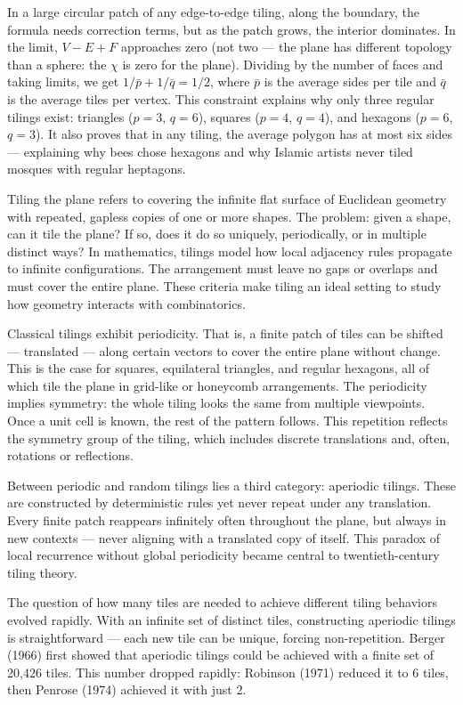 In a large circular patch of any edge-to-edge tiling, along the boundary, the formula needs correction terms, but as the patch grows, the interior dominates. In the limit, $V - E + F$ approaches zero (not two — the plane has different topology than a sphere: the $\chi$ is zero for the plane). Dividing by the number of faces and taking limits, we get $1/\bar{p} + 1/\bar{q} = 1/2$, where $\bar{p}$ is the average sides per tile and $\bar{q}$ is the average tiles per vertex. This constraint explains why only three regular tilings exist: triangles ($p=3$, $q=6$), squares ($p=4$, $q=4$), and hexagons ($p=6$, $q=3$). It also proves that in any tiling, the average polygon has at most six sides — explaining why bees chose hexagons and why Islamic artists never tiled mosques with regular heptagons.

Tiling the plane refers to covering the infinite flat surface of Euclidean geometry with repeated, gapless copies of one or more shapes. The problem: given a shape, can it tile the plane? If so, does it do so uniquely, periodically, or in multiple distinct ways? In mathematics, tilings model how local adjacency rules propagate to infinite configurations. The arrangement must leave no gaps or overlaps and must cover the entire plane. These criteria make tiling an ideal setting to study how geometry interacts with combinatorics.

Classical tilings exhibit periodicity. That is, a finite patch of tiles can be shifted — translated — along certain vectors to cover the entire plane without change. This is the case for squares, equilateral triangles, and regular hexagons, all of which tile the plane in grid-like or honeycomb arrangements. The periodicity implies symmetry: the whole tiling looks the same from multiple viewpoints. Once a unit cell is known, the rest of the pattern follows. This repetition reflects the symmetry group of the tiling, which includes discrete translations and, often, rotations or reflections.

Between periodic and random tilings lies a third category: aperiodic tilings. These are constructed by deterministic rules yet never repeat under any translation. Every finite patch reappears infinitely often throughout the plane, but always in new contexts — never aligning with a translated copy of itself. This paradox of local recurrence without global periodicity became central to twentieth-century tiling theory.

The question of how many tiles are needed to achieve different tiling behaviors evolved rapidly. With an infinite set of distinct tiles, constructing aperiodic tilings is straightforward — each new tile can be unique, forcing non-repetition. Berger (1966) first showed that aperiodic tilings could be achieved with a finite set of 20,426 tiles. This number dropped rapidly: Robinson (1971) reduced it to 6 tiles, then Penrose (1974) achieved it with just 2.

